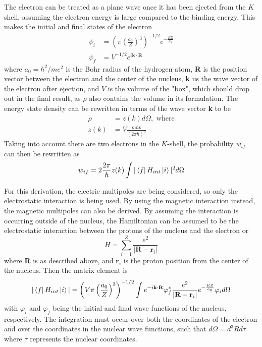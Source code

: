 The electron can be treated as a plane wave once it has been ejected from the $K$ shell, assuming the electron energy is large compared to the binding energy. This makes the initial and final states of the electron
\begin{subequations}
\begin{align}
    \psi_{i} & = \left(\pi\left(\frac{a_0}{Z}\right)^3\right)^{-1/2}e^{-\frac{RZ}{a_0}}\\
    \psi_{f} & = V^{-1/2}e^{i\textbf{k}\cdot\textbf{R}}
\end{align}
\end{subequations}
where $a_0=\hbar^2/me^2$ is the Bohr radius of the hydrogen atom, \textbf{R} is the position vector between the electron and the center of the nucleus, \textbf{k} us the wave vector of the electron after ejection, and $V$ is the volume of the "box", which should drop out in the final result, as $\rho$ also contains the volume in its formulation. The energy state density can be rewritten in terms of the wave vector \textbf{k} to be 
\begin{align}
    \rho & = z(k)d\Omega, \text{ where} \\
    z(k) & = V\frac{m\hbar k}{(2\pi\hbar)^3}
\end{align}
Taking into account there are two electrons in the $K$-shell, the probability $w_{if}$ can then be rewritten as
\begin{equation}
\label{eq:golden_ic}
    w_{if}=2 \frac{2\pi}{\hbar}z(k)\int|\bra{f}H_{int}\ket{i}|^2d\Omega
\end{equation}

For this derivation, the electric multipoles are being considered, so only the electrostatic interaction is being used. By using the magnetic interaction instead, the magnetic multipoles can also be derived. By assuming the interaction is occurring outside of the nucleus, the Hamiltonian can be assumed to be the electrostatic interaction between the protons of the nucleus and the electron or
\begin{equation}
    H=\sum_{i=1}^Z \frac{e^2}{|\textbf{R}-\textbf{r}_i|}
\end{equation}
where \textbf{R} is as described above, and $\textbf{r}_i$ is the proton position from the center of the nucleus. Then the matrix element is
\begin{equation}
\label{eq:matrix_element_int}
    |\bra{f}H_{int}\ket{i}| = \left(V\pi\left(\frac{a_0}{Z}\right)^3\right)^{-1/2}\int e^{-i\textbf{k}\cdot\textbf{R}}\varphi_{f}^* \frac{e^2}{|\textbf{R}-\textbf{r}_i|} e^{-\frac{RZ}{a_0}}\varphi_{i}d\Omega
\end{equation}
with $\varphi_{i}$ and $\varphi_{f}$ being the initial and final wave functions of the nucleus, respectively. The integration must occur over both the coordinates of the electron and over the coordinates in the nuclear wave functions, such that $d\Omega=d^3Rd\tau$ where $\tau$ represents the nuclear coordinates.

